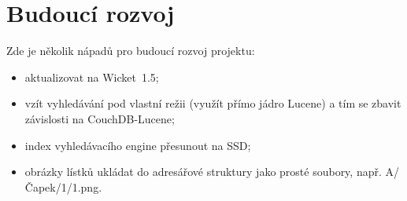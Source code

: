 \chapter{Budoucí rozvoj}

Zde je několik nápadů pro budoucí rozvoj projektu:

\begin{itemize}
\item{aktualizovat na Wicket~1.5;}
\item{vzít vyhledávání pod vlastní režii (využít přímo jádro Lucene) a tím se zbavit závislosti na CouchDB-Lucene;}
\item{index vyhledávacího engine přesunout na SSD;}
\item{obrázky lístků ukládat do adresářové struktury jako prosté soubory, např. A/Čapek/1/1.png.}
\end{itemize}
